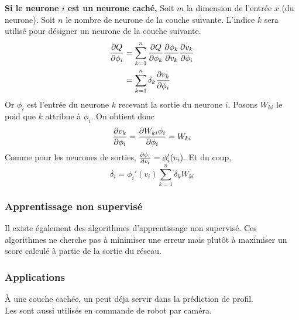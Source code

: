 \textbf{Si le neurone $i$ est un neurone caché,}
Soit $m$ la dimension de l'entrée $x$ (du neurone). Soit $n$ le nombre de neurone de la couche suivante.
L'indice $k$ sera utilisé pour désigner un neurone de la couche suivante.
\begin{equation}
 \begin{split}
  \frac{\partial Q}{\partial \phi_i} & = \sum_{k=1}^{n} \frac{\partial Q}{\partial \phi_k} \frac{\partial \phi_k}{\partial v_k} \frac{\partial v_k}{\partial \phi_i}\\
  ~ & = \sum_{k=1}^{n} \delta_k \frac{\partial v_k}{\partial \phi_i}
 \end{split}
\end{equation}
Or $\phi_i$ est l'entrée du neurone $k$ recevant la sortie du neurone $i$. Posons $W_{ki}$ le poid que $k$ attribue à $\phi_i$.
On obtient donc \[\frac{\partial v_k}{\partial \phi_i} = \frac{\partial W_{ki}\phi_i}{\partial \phi_i} = W_{ki}\]
Comme pour les neurones de sorties, $\frac{\partial \phi_i}{\partial v_i} = \phi_i'(v_i)$.
Et du coup, \[\delta_i = \phi_i'(v_i) \sum_{k=1}^{n} \delta_k W_{ki}\]
\subsubsection{Apprentissage non supervisé}
Il existe également des algorithmes d'apprentissage non supervisé.
Ces algorithmes ne cherche pas à minimiser une erreur mais plutôt à maximiser un score calculé à partie de la sortie du réseau.
\subsubsection{Applications}
À une couche cachée, un \mlp peut déja servir dans la prédiction de profil.\cite{statistica}\\
Les \mlp sont aussi utilisés en commande de robot par caméra.\cite{Pomerleau}